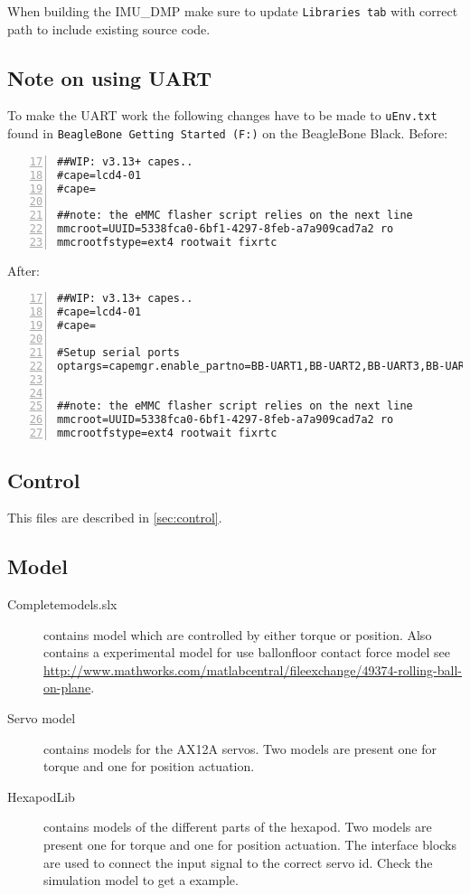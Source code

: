\documentclass[letterpaper, 10 pt]{report}
\begin{document}
When building the IMU{\_}DMP make sure to update \texttt{Libraries tab} with correct path to include existing source code.

\newpage
\subsection{Note on using UART}
To make the UART work the following changes have to be made to \texttt{uEnv.txt} found in 
\texttt{BeagleBone Getting Started (F:)} on the BeagleBone Black.
Before:
\begin{lstlisting}[frame=single,numbers=left,breaklines=true,firstnumber=17]
##WIP: v3.13+ capes..
#cape=lcd4-01
#cape=

##note: the eMMC flasher script relies on the next line
mmcroot=UUID=5338fca0-6bf1-4297-8feb-a7a909cad7a2 ro
mmcrootfstype=ext4 rootwait fixrtc
\end{lstlisting}

After:
\begin{lstlisting}[frame=single,numbers=left,breaklines=true,firstnumber=17]
##WIP: v3.13+ capes..
#cape=lcd4-01
#cape=

#Setup serial ports
optargs=capemgr.enable_partno=BB-UART1,BB-UART2,BB-UART3,BB-UART4,BB-UART5


##note: the eMMC flasher script relies on the next line
mmcroot=UUID=5338fca0-6bf1-4297-8feb-a7a909cad7a2 ro
mmcrootfstype=ext4 rootwait fixrtc
\end{lstlisting}



















\subsection{Control}
This files are described in \ref{sec:control}.

\subsection{Model}
\begin{description}
\item[Completemodels.slx] contains model which are controlled by either torque or position. Also contains a experimental model for use ballonfloor contact force model see \url{http://www.mathworks.com/matlabcentral/fileexchange/49374-rolling-ball-on-plane}.
\item[Servo model] contains models for the AX12A servos. Two models are present one for torque and one for position actuation. 
\item[HexapodLib] contains models of the different parts of the hexapod. Two models are present one for torque and one for position actuation.
The interface blocks are used to connect the input signal to the correct servo id. Check the simulation model to get a example.
\end{description}
\end{document}
